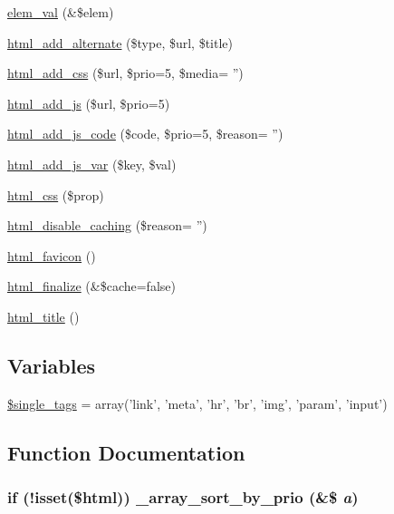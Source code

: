 \begin{CompactItemize}
\item 
\hyperlink{html_8inc_8php_e28d850c3c906c6884462ca89c06f59b}{elem\_\-val} (\&\$elem)
\item 
\hyperlink{html_8inc_8php_e013e8f0bdd681184ee1873a1964c454}{html\_\-add\_\-alternate} (\$type, \$url, \$title)
\item 
\hyperlink{html_8inc_8php_962ef1b29e909a38b9a7b79086d54ab2}{html\_\-add\_\-css} (\$url, \$prio=5, \$media= '')
\item 
\hyperlink{html_8inc_8php_450214704e1bbc2e8849abb54db38a03}{html\_\-add\_\-js} (\$url, \$prio=5)
\item 
\hyperlink{html_8inc_8php_90601d141e5751c07b61f32f623ed7d2}{html\_\-add\_\-js\_\-code} (\$code, \$prio=5, \$reason= '')
\item 
\hyperlink{html_8inc_8php_84769b7fe7b5454ff46534d0577eb54c}{html\_\-add\_\-js\_\-var} (\$key, \$val)
\item 
\hyperlink{html_8inc_8php_d52276fa2a03df7342ba4b8e6a334ce0}{html\_\-css} (\$prop)
\item 
\hyperlink{html_8inc_8php_b0dafe79ee61164014b0a4d8b4112dbb}{html\_\-disable\_\-caching} (\$reason= '')
\item 
\hyperlink{html_8inc_8php_5738adf9b56d1ff2b8d02977ed7929ce}{html\_\-favicon} ()
\item 
\hyperlink{html_8inc_8php_405dc7e3718d4196c05087057ebf69bf}{html\_\-finalize} (\&\$cache=false)
\item 
\hyperlink{html_8inc_8php_3f572f51a815fe19c590fea7d6d3a1a6}{html\_\-title} ()
\end{CompactItemize}
\subsection*{Variables}
\begin{CompactItemize}
\item 
\hyperlink{html_8inc_8php_0a733c7a281726a879f13e7325881887}{\$single\_\-tags} = array('link', 'meta', 'hr', 'br', 'img', 'param', 'input')
\end{CompactItemize}


\subsection{Function Documentation}
\hypertarget{html_8inc_8php_7fb2b386b2bae219112628971275c225}{
\subsubsection[{\_\-array\_\-sort\_\-by\_\-prio}]{\setlength{\rightskip}{0pt plus 5cm}if (!isset(\$html)) \_\-array\_\-sort\_\-by\_\-prio (\&\$ {\em a})}}
\label{html_8inc_8php_7fb2b386b2bae219112628971275c225}


